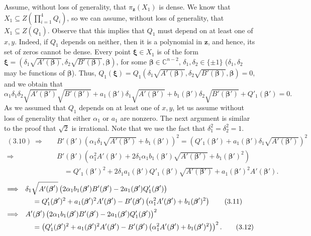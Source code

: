 Assume, without loss of generality, that $\pi_{\mathbf z}(X_1)$ is dense. We know that $X_1\subseteq Z(\prod_{i=1}^4Q_i)$, so we can assume, without loss of generality, that $X_1\subseteq Z(Q_1)$. Observe that this implies that $Q_1$ must depend on at least one of $x,y$. Indeed, if $Q_1$ depends on neither, then it is a polynomial in $\mathbf z$, and hence, its set of zeros cannot be dense.
Every point $\boldsymbol\xi\in X_1$ is of the form $\boldsymbol\xi=(\delta_1\sqrt{A'(\boldsymbol\beta)},\delta_2\sqrt{B'(\boldsymbol\beta)},\boldsymbol\beta)$, for some $\boldsymbol\beta\in\mathbb C^{n-2}$, $\delta_1,\delta_2\in\{\pm1\}$ ($\delta_1,\delta_2$ may be functions of $\boldsymbol\beta$). Thus, $Q_1(\boldsymbol\xi)=Q_1(\delta_1\sqrt{A'(\boldsymbol\beta)},\delta_2\sqrt{B'(\boldsymbol\beta)},\boldsymbol\beta)=0$, and we obtain that
\begin{equation}\alpha_1\delta_1\delta_2\sqrt{A'(\boldsymbol\beta')}\sqrt{B'(\boldsymbol\beta')}+a_1(\boldsymbol\beta')\delta_1\sqrt{A'(\boldsymbol\beta')}+b_1(\boldsymbol\beta')\delta_2\sqrt{B'(\boldsymbol\beta')}+Q'_1(\boldsymbol\beta')=0.\tag{3.10}\end{equation}
As we assumed that $Q_1$ depends on at least one of $x,y$, let us assume without loss of generality that either $\alpha_1$ or $a_1$ are nonzero. The next argument is similar to the proof that $\sqrt2$ is irrational. Note that we use the fact that $\delta_1^2=\delta_2^2=1$.
\begin{align*}(3.10)\ \Longrightarrow\quad&B'(\boldsymbol\beta')\left(\alpha_1\delta_1\sqrt{A'(\boldsymbol\beta')}+b_1(\boldsymbol\beta')\right)^2=\left(Q'_1(\boldsymbol\beta')+a_1(\boldsymbol\beta')\delta_1\sqrt{A'(\boldsymbol\beta')}\right)^2\\\Longrightarrow\quad&B'(\boldsymbol\beta')\left(\alpha_1^2A'(\boldsymbol\beta')+2\delta_1\alpha_1b_1(\boldsymbol\beta')\sqrt{A'(\boldsymbol\beta')}+b_1(\boldsymbol\beta')^2\right)\\&\quad=Q'_1(\boldsymbol\beta')^2+2\delta_1a_1(\boldsymbol\beta')Q'_1(\boldsymbol\beta')\sqrt{A'(\boldsymbol\beta')}+a_1(\boldsymbol\beta')^2A'(\boldsymbol\beta').\end{align*}
\begin{align}\Longrightarrow\quad&\delta_1\sqrt{A'(\boldsymbol\beta')}\left(2\alpha_1b_1(\boldsymbol\beta')B'(\boldsymbol\beta')-2a_1(\boldsymbol\beta')Q'_1(\boldsymbol\beta')\right)\notag\\&\quad=Q'_1(\boldsymbol\beta')^2+a_1(\boldsymbol\beta')^2A'(\boldsymbol\beta')-B'(\boldsymbol\beta')\left(\alpha_1^2A'(\boldsymbol\beta')+b_1(\boldsymbol\beta')^2\right)\tag{3.11}\\\Longrightarrow\quad&A'(\boldsymbol\beta')\left(2\alpha_1b_1(\boldsymbol\beta')B'(\boldsymbol\beta')-2a_1(\boldsymbol\beta')Q'_1(\boldsymbol\beta')\right)^2\notag\\&\quad=\left(Q'_1(\boldsymbol\beta')^2+a_1(\boldsymbol\beta')^2A'(\boldsymbol\beta')-B'(\boldsymbol\beta')\left(\alpha_1^2A'(\boldsymbol\beta')+b_1(\boldsymbol\beta')^2\right)\right)^2.\tag{3.12}\end{align}
